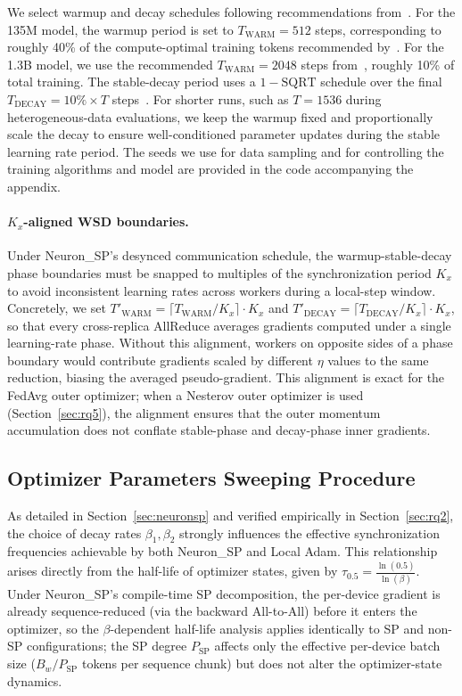 \documentclass{article}
\begin{document}
We select warmup and decay schedules following recommendations from~\citet{zhang2025critical,hagele2024scaling,allal2025smollm2}. For the 135M model, the warmup period is set to $T_{\text{WARM}} = 512$
steps, corresponding to roughly 40\% of the compute-optimal training tokens recommended by~\citet{zhang2025critical}. For the 1.3B model, we use the recommended $T_{\text{WARM}} = 2048$ steps from~\citet{allal2025smollm2}, roughly 10\% of total training. The stable-decay period uses a $1 - \text{SQRT}$ schedule over
the final $T_{\text{DECAY}} = 10\% \times T$ steps~\citep{hagele2024scaling}. For shorter runs, such as $T = 1536$ during heterogeneous-data evaluations, we keep the warmup fixed and proportionally scale the decay to ensure well-conditioned parameter updates during the stable learning rate period. The seeds we use for data sampling and for controlling the training algorithms and model are provided in the code accompanying the appendix.

\paragraph{$K_x$-aligned WSD boundaries.}
Under Neuron\_SP's desynced communication schedule, the warmup-stable-decay phase boundaries
must be snapped to multiples of the synchronization period $K_x$ to avoid inconsistent
learning rates across workers during a local-step window.
Concretely, we set $T'_{\text{WARM}} = \lceil T_{\text{WARM}} / K_x \rceil \cdot K_x$ and
$T'_{\text{DECAY}} = \lceil T_{\text{DECAY}} / K_x \rceil \cdot K_x$, so that every
cross-replica AllReduce averages gradients computed under a single learning-rate phase.
Without this alignment, workers on opposite sides of a phase boundary would contribute
gradients scaled by different $\eta$ values to the same reduction, biasing the averaged
pseudo-gradient.
This alignment is exact for the FedAvg outer optimizer; when a Nesterov outer optimizer is
used (Section~\ref{sec:rq5}), the alignment ensures that the outer momentum accumulation
does not conflate stable-phase and decay-phase inner gradients.

\subsection{Optimizer Parameters Sweeping Procedure}
\label{sec:sweep}

As detailed in Section~\ref{sec:neuronsp} and verified empirically in Section~\ref{sec:rq2}, the choice of decay rates $\beta_1, \beta_2$
strongly influences the effective synchronization frequencies achievable by both Neuron\_SP and
Local Adam. This relationship arises directly from the half-life of optimizer states, given by
$\tau_{0.5} = \frac{\ln(0.5)}{\ln(\beta)}$.
Under Neuron\_SP's compile-time SP decomposition, the per-device gradient is already
sequence-reduced (via the backward All-to-All) before it enters the optimizer, so the
$\beta$-dependent half-life analysis applies identically to SP and non-SP configurations;
the SP degree $P_{\text{SP}}$ affects only the effective per-device batch size
($B_w / P_{\text{SP}}$ tokens per sequence chunk) but does not alter the optimizer-state
dynamics.
\end{document}
